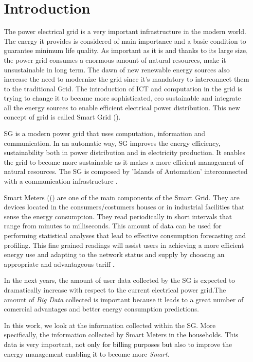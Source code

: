 \chapter{Introduction}\label{c:intro}
The power electrical grid is a very important infrastructure in the modern world. The energy it provides is considered of main importance and a basic condition to guarantee minimum life quality. As important as it is and thanks to its large size, the power grid consumes a enormous amount of natural resources, make it unsustainable in long term. The dawn of new renewable energy sources also increase the need to modernize the grid since it's mandatory to interconnect them to the traditional Grid. The introduction of ICT and computation in the grid is trying to change it to became more sophisticated, eco sustainable and integrate all the energy sources to enable efficient electrical power distribution. This new concept of grid is called Smart Grid ().

SG is a modern power grid that uses computation, information and communication. In an automatic way, SG improves the energy efficiency, sustainability both in power distribution and in electricity production. It enables the grid to become more sustainable as it makes a more efficient management of  natural resources. The SG is composed by 'Islands of Automation' interconnected with a communication infrastructure \cite{Ericsson_2}. 

Smart Meters (() are one of the main components of the Smart Grid. They are devices located in the consumers/costumers houses or in industrial facilities that sense the energy consumption. They  read periodically in short intervals that range from minutes to milliseconds. This amount of data can be used for performing statistical analyses that lead to effective consumption forecasting and profiling. This fine grained readings will assist users in achieving a more efficient energy use and adapting to the network status and supply by choosing an appropriate and advantageous tariff \cite{journals/spm/ErkinTLP13}.

In the next years, the amount of user data collected by the SG is expected to dramatically increase with respect to the current electrical power grid.The amount of \textit{Big Data} collected is important because it leads to a great number of comercial advantages and better energy consumption predictions\cite{INDIN2013aggregationPerformance}.

In this work, we look at the information collected within the SG. More specifically, the information collected by Smart Meters in the households. This data is very important, not only for billing purposes but also to improve the energy management enabling it to become more \textit{Smart}.  


